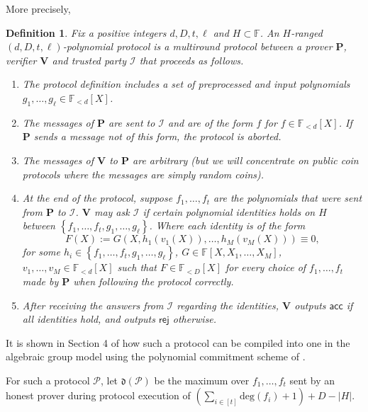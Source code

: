 \documentclass[11pt]{article} %
\newcommand{\F}{\ensuremath{\mathbb F}\xspace}
\renewcommand{\deg}{\ensuremath{\mathrm{deg}}\xspace}
\newcommand{\rej}{\ensuremath{\mathsf{rej}}\xspace}
\newcommand{\acc}{\ensuremath{\mathsf{acc}}\xspace}
\newcommand{\defeq}{:=}
\newcommand{\prv}{\ensuremath{\mathsf{\mathbf{P}}}\xspace}
\newcommand{\prvpoly}{\ensuremath{\prv}\xspace}
\newcommand{\verpoly}{\ensuremath{\ver}\xspace}%
\newcommand{\ideal}{\ensuremath{\mathcal{I}}\xspace}
\newcommand{\ver}{\ensuremath{\mathsf{\mathbf{V}}}\xspace}
\newcommand{\set}[1]{\ensuremath{\left\{#1\right\}}\xspace}
\newcommand{\polysofdeg}[1]{\ensuremath{\F_{< #1}[X]}\xspace}
\newcommand{\prot}{\ensuremath{\mathscr{P}}\xspace}
\newcommand{\aggdeg}[1]{\ensuremath{\mathfrak{d}(#1)}\xspace}
\newtheorem{dfn}[lemma]{Definition}
\begin{document}
More precisely,
\begin{dfn}\label{dfn:polyprotocol}
Fix a positive integers $d,D,t,\ell$ and $H\subset \F$.
An $H$-ranged \emph{$(d,D,t,\ell)$-polynomial protocol} is a multiround protocol between a prover \prvpoly, verifier 
\verpoly and trusted party \ideal that proceeds as follows.

\begin{enumerate}
\item The protocol definition includes a set of \emph{preprocessed and input polynomials} $g_1,\ldots,g_\ell \in \polysofdeg{d}$.

\item The messages of \prvpoly are sent to \ideal and are of the form $f$ for $f\in \polysofdeg{d}$. If \prvpoly sends a message not of this form, the protocol is aborted.
 
 
\item The messages of  \verpoly to \prvpoly are arbitrary (but we will concentrate on public coin protocols where the messages are simply random coins).


 \item At the end of the protocol, suppose $f_1,\ldots,f_t$ are the polynomials that were sent from \prvpoly to \ideal. \verpoly may ask \ideal if certain polynomial identities holds \emph{on $H$} between \set{f_1,\ldots,f_t,g_1,\ldots,g_\ell}.
 Where each identity is of the form
 \[F(X)\defeq G(X, h_1(v_1(X)),\ldots,h_M(v_M(X)))\equiv 0,\]
 for some $h_i\in  \set{f_1,\ldots,f_t,g_1,\ldots,g_\ell}$, $G\in \F[X,X_1,\ldots,X_{M}]$, $v_1,\ldots,v_{M} \in \polysofdeg{d}$
 such that $F\in \polysofdeg{D}$ for every choice of $f_1,\ldots,f_t$ made by \prvpoly when following the protocol correctly.
 
 
 
 \item After receiving the answers from \ideal regarding the identities, \verpoly outputs \acc if all identities hold, and outputs \rej otherwise.

\end{enumerate}
 
\end{dfn}


It is shown in Section 4 of \cite{plonk} how such a protocol can be compiled into one in the algebraic group model using the polynomial commitment scheme of \cite{kate}.


For such a protocol \prot, let $\aggdeg{\prot}$ be the maximum over $f_1,\ldots,f_t$ sent by an honest prover during protocol execution of $\left(\sum_{i\in [t]} \deg(f_i)+1\right)+D-|H|$.
\end{document}
